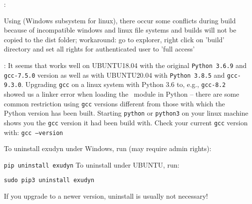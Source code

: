 \noindent {}:
\bi
  \item Using  (Windows subsystem for linux), there occur some conflicts during build because of incompatible windows and linux file systems and builds will not be copied to the dist folder; workaround: go to explorer, right click on 'build' directory and set all rights for authenticated user to 'full access'
  \item {}: It seems that \codeName works well on UBUNTU18.04 with the original \texttt{Python 3.6.9} and \texttt{gcc-7.5.0} version as well as with UBUNTU20.04 with \texttt{Python 3.8.5} and \texttt{gcc-9.3.0}. Upgrading \texttt{gcc} on a linux system with Python 3.6 to, e.g., \texttt{gcc-8.2} showed us a linker error when loading the \codeName\ module in Python -- there are some common restriction using \texttt{gcc} versions different from those with which the Python version has been built. Starting \texttt{python} or \texttt{python3} on your linux machine shows you the \texttt{gcc} version it had been build with. Check your current \texttt{gcc} version with: \texttt{gcc --version}
\ei


To uninstall exudyn under Windows, run (may require admin rights):
\bi
  \item[] \texttt{pip uninstall exudyn}
\ei
\noindent To uninstall under UBUNTU, run:
\bi
  \item[] \texttt{sudo pip3 uninstall exudyn}
\ei

If you upgrade to a newer version, uninstall is usually not necessary!
%

